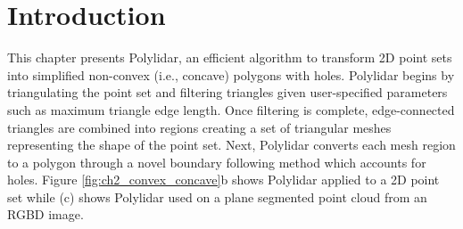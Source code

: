 \section{Introduction}


This chapter presents Polylidar, an efficient algorithm to transform 2D point sets into simplified non-convex (i.e., concave) polygons with holes. Polylidar begins by triangulating the point set and filtering triangles given user-specified parameters such as maximum triangle edge length. Once filtering is complete, edge-connected triangles are combined into regions creating a set of triangular meshes representing the shape of the point set. Next, Polylidar converts each mesh region to a polygon through a novel boundary following method which accounts for holes. Figure \ref{fig:ch2_convex_concave}b shows Polylidar applied to a 2D point set while (c) shows Polylidar used on a plane segmented point cloud from an RGBD image.


